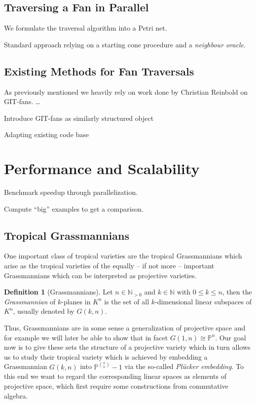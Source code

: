 \documentclass[
  paper=a4,
  DIV=14,
  fontsize=12pt,
  titlepage,
  bibliography=totoc,
  pagesize=pdftex
]{scrartcl}
\numberwithin{figure}{section}
\numberwithin{equation}{section}
\numberwithin{table}{section}
\newcommand*\setN{\mathds{N}}
\newcommand*\setP{\mathds{P}}
\theoremstyle{definition}
\newtheorem{definition}{Definition}
\numberwithin{definition}{section}
\begin{document}
\subsection{Traversing a Fan in Parallel}

We formulate the traversal algorithm into a Petri net.

Standard approach relying on a starting cone procedure and a \emph{neighbour oracle}.

\subsection{Existing Methods for Fan Traversals}

As previously mentioned we heavily rely on work done by Christian Reinbold on GIT-fans.
\dots

Introduce GIT-fans as similarly structured object

Adapting existing code base

\section{Performance and Scalability}

Benchmark speedup through parallelization.

Compute \enquote{big} examples to get a comparison.

\subsection{Tropical Grassmannians}

One important class of tropical varieties are the tropical Grassmannians which arise as
the tropical varieties of the equally -- if not more -- important Grassmannians which can
be interpreted as projective varieties.

\begin{definition}[Grassmannians]
  Let $n \in \setN_{>0}$ and $k \in \setN$ with $0 \leq k \leq n$, then the
  \emph{Grassmannian} of $k$-planes in $K^n$ is the set of all $k$-dimensional linear
  subspaces of $K^n$, usually denoted by $G(k, n)$.
\end{definition}

Thus, Grassmannians are in some sense a generalization of projective space and for example
we will later be able to show that in facet $G(1,n) \cong \setP^n$. Our goal now is to
give these sets the structure of a projective variety which in turn allows us to study their
tropical variety which is achieved by embedding a Grassmannian $G(k, n)$ into $\setP^{\binom
nk}-1$ via the so-called \emph{Plücker embedding}. To this end we want to regard the
corresponding linear spaces as elements of projective space, which first require some
constructions from commutative algebra.
\end{document}
